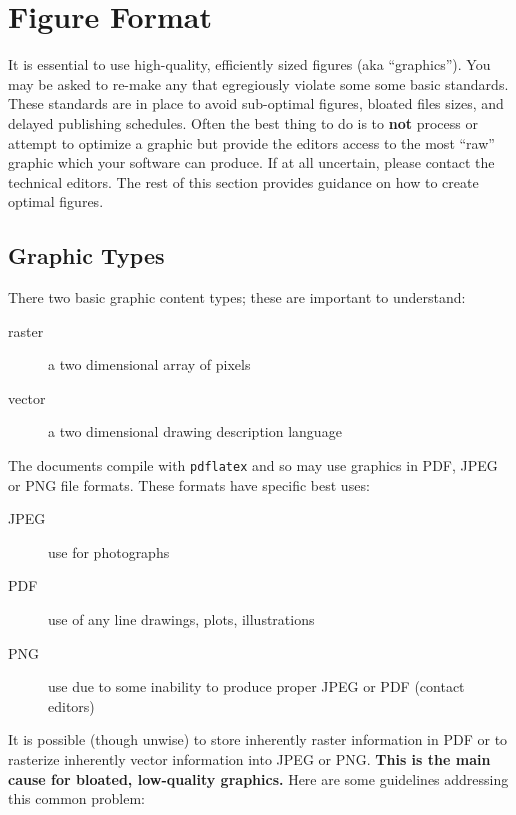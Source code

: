 \section{Figure Format}
\label{sec:figure-format}

It is essential to use high-quality, efficiently sized figures (aka
``graphics'').
You may be asked to re-make any that egregiously violate some some
basic standards.
These standards are in place to avoid sub-optimal figures, bloated
files sizes, and delayed publishing schedules.  
Often the best thing to do is to \textbf{not} process or attempt to
optimize a graphic but provide the editors access to the most ``raw''
graphic which your software can produce.
If at all uncertain, please contact the technical editors.
The rest of this section provides guidance on how to create optimal
figures.

\subsection{Graphic Types}
\label{sec:graphic-types}

There two basic graphic content types; these are important to understand:

\begin{description}
\item[raster] a two dimensional array of pixels
\item[vector] a two dimensional drawing description language
\end{description}

The documents compile with \texttt{pdflatex} and so may use graphics
in PDF, JPEG or PNG file formats.
These formats have specific best uses:

\begin{description}
\item[JPEG] use for photographs
\item[PDF] use of any line drawings, plots, illustrations
\item[PNG] use due to some inability to produce proper JPEG or PDF (contact editors)
\end{description}

It is possible (though unwise) to store inherently raster information
in PDF or to rasterize inherently vector information into JPEG or PNG.
\textbf{This is the main cause for bloated, low-quality graphics.}
Here are some guidelines addressing this common problem:

